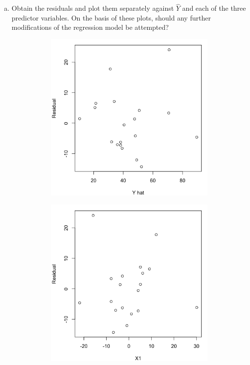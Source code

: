 \documentclass[10pt]{report}
\begin{document}
\begin{enumerate}[a.]
	\item 
	Obtain the residuals and plot them separately against $\hat{Y}$ and each of the three predictor variables. On the basis of these plots, should any further modifications of the regression model be attempted?
	\begin{figure}[H]
		\centering
		\begin{subfigure}[b]{.25\linewidth}
			\includegraphics[width=\linewidth]{p4/20a_yhat.png}
		\end{subfigure}%
		\begin{subfigure}[b]{.25\linewidth}
			\includegraphics[width=\linewidth]{p4/20a_x1.png} 

\end{subfigure}
\end{figure}
\end{enumerate}
\end{document}
